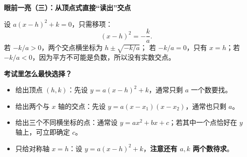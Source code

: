 \clearpage
\begin{explanationbox}
\textbf{\textcolor{CExplanation}{眼前一亮（三）：从顶点式直接“读出”交点}}


设 $a(x-h)^2+k=0$，只需移项：
\[
(x-h)^2=-\frac{k}{a}.
\]
若 $-k/a>0$，两个交点横坐标为 $h\pm\sqrt{-k/a}$；
若 $-k/a=0$，只有 $x=h$；若 $-k/a<0$，因为平方不可能是负数，所以没有实数交点。

\medskip

\end{explanationbox}
\clearpage
\begin{explanationbox}
\textbf{\textcolor{CExplanation}{考试里怎么最快选择？}}
\begin{itemize}[leftmargin=*,itemsep=0.3em,topsep=0.3em]
\item 给出顶点 $(h,k)$：先设 $y=a(x-h)^2+k$，通常只剩 $a$ 一个数要找。
\item 给出两个与 $x$ 轴的交点：先设 $y=a(x-x_1)(x-x_2)$，通常也只剩 $a$。
\item 给出三个不同横坐标的点：通常设 $y=ax^2+bx+c$；若其中一个点恰好在 $y$ 轴上，可立即确定 $c$。
\item 只给对称轴 $x=h$：设 $y=a(x-h)^2+k$，\textbf{注意还有 $a,k$ 两个数待求}。
\end{itemize}
\end{explanationbox}
